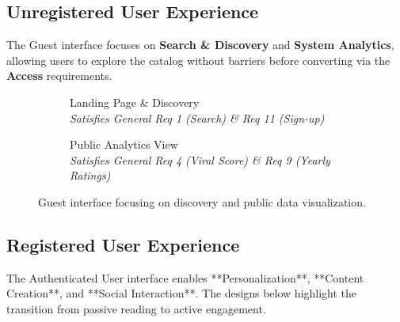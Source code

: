 \subsection{Unregistered User Experience}
The Guest interface focuses on \textbf{Search \& Discovery} and \textbf{System Analytics}, allowing users to explore the catalog without barriers before converting via the \textbf{Access} requirements.

\begin{figure}[H]
    \centering
    \begin{subfigure}[b]{0.45\textwidth}
        \centering
        \caption{Landing Page \& Discovery \\ \textit{Satisfies General Req 1 (Search) \& Req 11 (Sign-up)}}
        \label{fig:mockup_guest_search}
    \end{subfigure}
    \hfill
    \begin{subfigure}[b]{0.45\textwidth}
        \centering
        \caption{Public Analytics View \\ \textit{Satisfies General Req 4 (Viral Score) \& Req 9 (Yearly Ratings)}}
        \label{fig:mockup_guest_stats}
    \end{subfigure}
    \caption{Guest interface focusing on discovery and public data visualization.}
    \label{fig:mockup_guest_group}
\end{figure}


\subsection{Registered User Experience}
The Authenticated User interface enables **Personalization**, **Content Creation**, and **Social Interaction**. The designs below highlight the transition from passive reading to active engagement.

